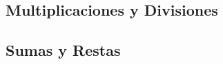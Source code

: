 \documentclass[12pt,addpoints,answers]{repaso}
\begin{document}
\begin{questions}
	\subsection*{Multiplicaciones y Divisiones}

	\subsection*{Sumas y Restas}


\end{questions}
\end{document}
